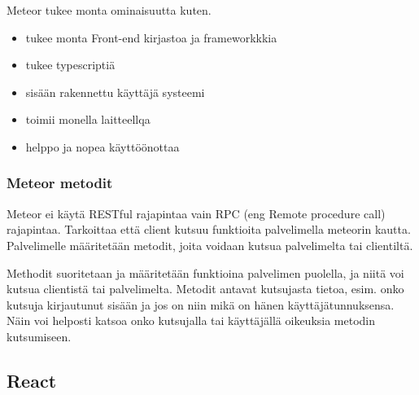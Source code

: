 \documentclass[11pt,a4paper,titlepage,oneside]{article}
\begin{document}
    

Meteor tukee monta ominaisuutta kuten.
\begin{itemize}
    \item tukee monta Front-end kirjastoa ja frameworkkkia
    \item tukee typescriptiä
    \item sisään rakennettu käyttäjä systeemi
    \item toimii monella laitteellqa
    \item helppo ja nopea käyttöönottaa 
\end{itemize}




\subsubsection{Meteor metodit}






Meteor ei käytä RESTful rajapintaa vain RPC (eng Remote procedure call) rajapintaa. 
Tarkoittaa että client kutsuu funktioita palvelimella meteorin kautta.
Palvelimelle määritetään metodit, joita voidaan kutsua palvelimelta tai clientiltä.




\medskip


Methodit suoritetaan ja määritetään funktioina palvelimen puolella, ja niitä voi kutsua clientistä tai palvelimelta.
Metodit antavat kutsujasta tietoa, esim. onko kutsuja kirjautunut sisään ja jos on niin mikä on hänen käyttäjätunnuksensa. 
Näin voi helposti katsoa onko kutsujalla tai käyttäjällä oikeuksia metodin kutsumiseen.








\newpage
\subsection{React}                %
\wordcount
\end{document}

